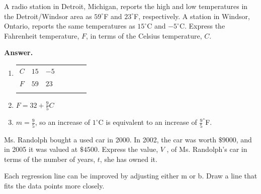 \documentclass[10pt,]{book}
\theoremstyle{plain}
\theoremstyle{definition}
\theoremstyle{definition}
\theoremstyle{definition}
\theoremstyle{definition}
\numberwithin{equation}{part}
\newcommand{\hrulethin}  {\noalign{\hrule height 0.04em}}
\newcommand\degree[0]{^{\circ}}
\begin{document}
\begin{exercisegroup}
\exercise[5.]\hypertarget{exercise-361}{}A radio station in Detroit, Michigan, reports the high and low temperatures in the Detroit/Windsor area as \(59\degree\)F and \(23\degree\)F, respectively. A station in Windsor, Ontario, reports the same temperatures as \(15\degree\)C and \(-5\degree\)C. Express the Fahrenheit temperature, \(F\), in terms of the Celsius temperature, \(C\).%
\par\smallskip
\noindent\textbf{Answer.}\hypertarget{answer-204}{}\quad
\leavevmode%
\begin{enumerate}[label=*\alph**]
\item\hypertarget{li-1366}{}\begin{tabular}{AcAcAcA}\hrulethin
\(C\)&\(15\)&\(-5\)\tabularnewline\hrulethin
\(F\)&\(59\)&\(23\)\tabularnewline\hrulethin
\end{tabular}
%
\item\hypertarget{li-1367}{}\(F=32+\frac{9}{5}C \)%
\item\hypertarget{li-1368}{}\(m =\frac{9}{5} \), so an increase of \(1\degree\)C is equivalent to an increase of \(\frac{9}{5}\degree\)F.%
\end{enumerate}
%
\exercise[6.]\hypertarget{exercise-362}{}Ms. Randolph bought a used car in 2000. In 2002, the car was worth \(\$9000\), and in 2005 it was valued at \(\$4500\). Express the value, \(V\) , of Ms. Randolph's car in terms of the number of years, \(t\), she has owned it.%
\end{exercisegroup}
\par\smallskip\noindent
\hypertarget{exercisegroup-47}{}\par\noindent Each regression line can be improved by adjusting either m or b. Draw a line that fits the data points more closely.%
\end{document}
